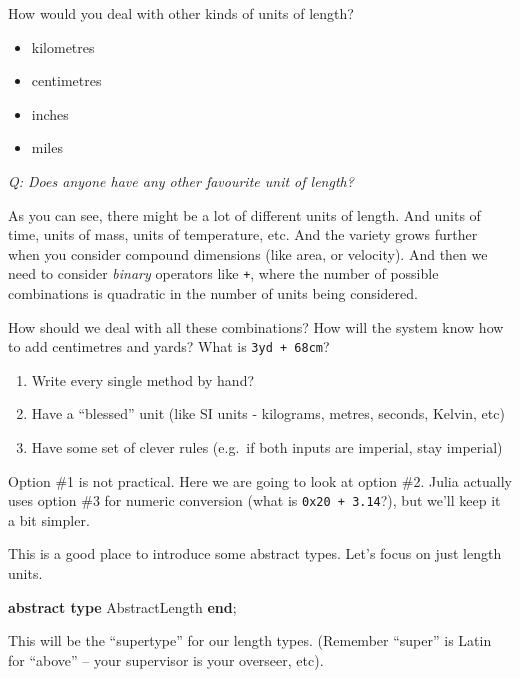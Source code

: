 \documentclass[
]{article}
\newenvironment{Shaded}{\begin{snugshade}}{\end{snugshade}}
\newcommand{\KeywordTok}[1]{\textcolor[rgb]{0.00,0.23,0.31}{\textbf{#1}}}
\newcommand{\NormalTok}[1]{\textcolor[rgb]{0.00,0.23,0.31}{#1}}
\providecommand{\tightlist}{%
  \setlength{\itemsep}{0pt}\setlength{\parskip}{0pt}}
\begin{document}
How would you deal with other kinds of units of length?

\begin{itemize}
\tightlist
\item
  kilometres
\item
  centimetres
\item
  inches
\item
  miles
\end{itemize}

\emph{Q: Does anyone have any other favourite unit of length?}

As you can see, there might be a lot of different units of length. And
units of time, units of mass, units of temperature, etc. And the variety
grows further when you consider compound dimensions (like area, or
velocity). And then we need to consider \emph{binary} operators like
\texttt{+}, where the number of possible combinations is quadratic in
the number of units being considered.

How should we deal with all these combinations? How will the system know
how to add centimetres and yards? What is \texttt{3yd\ +\ 68cm}?

\begin{enumerate}
\def\labelenumi{\arabic{enumi}.}
\tightlist
\item
  Write every single method by hand?
\item
  Have a ``blessed'' unit (like SI units - kilograms, metres, seconds,
  Kelvin, etc)
\item
  Have some set of clever rules (e.g.~if both inputs are imperial, stay
  imperial)
\end{enumerate}

Option \#1 is not practical. Here we are going to look at option \#2.
Julia actually uses option \#3 for numeric conversion (what is
\texttt{0x20\ +\ 3.14}?), but we'll keep it a bit simpler.

This is a good place to introduce some abstract types. Let's focus on
just length units.

\begin{Shaded}
\begin{Highlighting}[]
\KeywordTok{abstract type}\NormalTok{ AbstractLength}
\KeywordTok{end}\NormalTok{;}
\end{Highlighting}
\end{Shaded}

This will be the ``supertype'' for our length types. (Remember ``super''
is Latin for ``above'' -- your supervisor is your overseer, etc).
\end{document}
